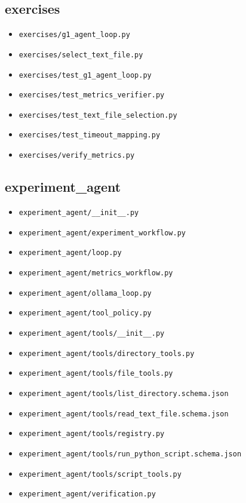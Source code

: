 \subsection{exercises}
\begin{itemize}
\item \nolinkurl{exercises/g1_agent_loop.py}
\item \nolinkurl{exercises/select_text_file.py}
\item \nolinkurl{exercises/test_g1_agent_loop.py}
\item \nolinkurl{exercises/test_metrics_verifier.py}
\item \nolinkurl{exercises/test_text_file_selection.py}
\item \nolinkurl{exercises/test_timeout_mapping.py}
\item \nolinkurl{exercises/verify_metrics.py}
\end{itemize}

\subsection{experiment\_agent}
\begin{itemize}
\item \nolinkurl{experiment_agent/__init__.py}
\item \nolinkurl{experiment_agent/experiment_workflow.py}
\item \nolinkurl{experiment_agent/loop.py}
\item \nolinkurl{experiment_agent/metrics_workflow.py}
\item \nolinkurl{experiment_agent/ollama_loop.py}
\item \nolinkurl{experiment_agent/tool_policy.py}
\item \nolinkurl{experiment_agent/tools/__init__.py}
\item \nolinkurl{experiment_agent/tools/directory_tools.py}
\item \nolinkurl{experiment_agent/tools/file_tools.py}
\item \nolinkurl{experiment_agent/tools/list_directory.schema.json}
\item \nolinkurl{experiment_agent/tools/read_text_file.schema.json}
\item \nolinkurl{experiment_agent/tools/registry.py}
\item \nolinkurl{experiment_agent/tools/run_python_script.schema.json}
\item \nolinkurl{experiment_agent/tools/script_tools.py}
\item \nolinkurl{experiment_agent/verification.py}
\end{itemize}

